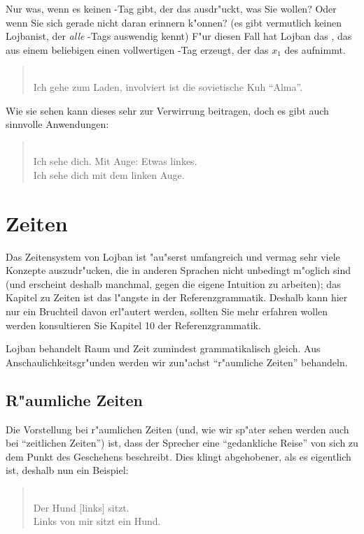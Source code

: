 Nur was, wenn es keinen -Tag gibt, der das ausdr"uckt, was Sie wollen? Oder wenn Sie sich gerade nicht daran erinnern k"onnen? (es gibt
vermutlich keinen Lojbanist, der \emph{alle} -Tags auswendig kennt)
F"ur diesen Fall hat Lojban das  , das aus einem beliebigen  einen vollwertigen -Tag erzeugt, der das $x_1$ des  aufnimmt.
\begin{quote}
 \\
Ich gehe zum Laden, involviert ist die sovietische Kuh ``Alma''.
\end{quote}
Wie sie sehen kann dieses  sehr zur Verwirrung beitragen, doch es gibt auch sinnvolle Anwendungen:
\begin{quote}
 \\
Ich sehe dich. Mit Auge: Etwas linkes. \\
Ich sehe dich mit dem linken Auge.
\end{quote}

\section{Zeiten}
Das Zeitensystem von Lojban ist "au"serst umfangreich und vermag sehr viele Konzepte auszudr"ucken, die in anderen Sprachen nicht unbedingt
m"oglich sind (und erscheint deshalb manchmal, gegen die eigene Intuition zu arbeiten); das Kapitel zu Zeiten ist das l"angste in der
Referenzgrammatik. Deshalb kann hier nur ein Bruchteil davon erl"autert werden, sollten Sie mehr erfahren wollen werden konsultieren Sie Kapitel
10 der Referenzgrammatik.

Lojban behandelt Raum und Zeit zumindest grammatikalisch gleich. Aus Anschaulichkeitsgr"unden werden wir zun"achst ``r"aumliche Zeiten'' behandeln.

\subsection{R"aumliche Zeiten}
Die Vorstellung bei r"aumlichen Zeiten (und, wie wir sp"ater sehen werden auch bei ``zeitlichen Zeiten'') ist, dass der Sprecher eine ``gedankliche Reise'' von sich zu dem Punkt des Geschehens beschreibt.
Dies klingt abgehobener, als es eigentlich ist, deshalb nun ein Beispiel:
\begin{quote}
 \\
Der Hund [links] sitzt.\\
Links von mir sitzt ein Hund.
\end{quote}


